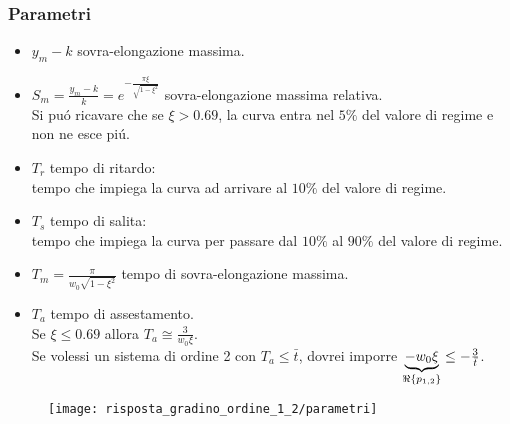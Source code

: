\documentclass[../main.tex]{subfiles}
\begin{document}
	\subsubsection{Parametri}
		\begin{itemize}
			\item 
				$ y_m - k $ sovra-elongazione massima.
			\item 
				$ S_m = \frac{y_m-k}{k} = e^{-\frac{\pi \xi}{\sqrt{1-\xi^2}}} $ sovra-elongazione massima relativa.\\
				Si pu\'o ricavare che se $ \xi > 0.69 $, la curva entra nel $ 5\% $ del valore di regime e non ne esce pi\'u.
			\item 
				$ T_r $ tempo di ritardo:\\ 
			tempo che impiega la curva ad arrivare al $ 10\% $ del valore di regime.
			\item 
				$ T_s $ tempo di salita:\\
			tempo che impiega la curva per passare dal $ 10\% $ al $ 90\% $ del valore di regime.
			\item 
				$ T_m = \frac{\pi}{w_0 \sqrt{1-\xi^2}} $ tempo di sovra-elongazione massima.
			\item 
				$ T_a $ tempo di assestamento.\\
				Se $ \xi \leq 0.69 $ allora $ T_a \cong \frac{3}{w_0 \xi} $.\\
				Se volessi un sistema di ordine 2 con $ T_a \leq \bar t $, dovrei imporre $ \underbrace{-w_0 \xi}_{ \Re \left\lbrace p_{1,2} \right\rbrace } \leq -\frac{3}{\bar t} $.
		\end{itemize}
		\begin{figure}[H]
			\centering
			\texttt{[image: risposta\_gradino\_ordine\_1\_2/parametri]}
		\end{figure}
		
\end{document}

